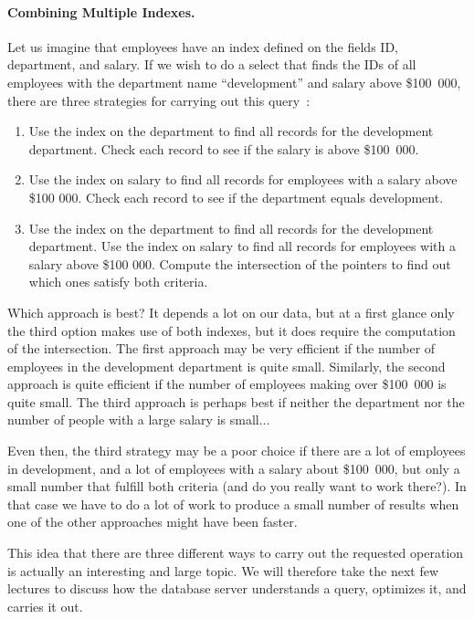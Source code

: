 \paragraph{Combining Multiple Indexes.} Let us imagine that employees have an index defined on the fields ID, department, and salary. If we wish to do a select that finds the IDs of all employees with the department name ``development'' and salary above \$100~000, there are three strategies for carrying out this query~\cite{dsc}:

\begin{enumerate}
	\item Use the index on the department to find all records for the development department. Check each record to see if the salary is above \$100~000.
	\item Use the index on salary to find all records for employees with a salary above \$100 000. Check each record to see if the department equals development.
	\item Use the index on the department to find all records for the development department. Use the index on salary to find all records for employees with a salary above \$100 000. Compute the intersection of the pointers to find out which ones satisfy both criteria.
\end{enumerate}

Which approach is best? It depends a lot on our data, but at a first glance only the third option makes use of both indexes, but it does require the computation of the intersection. The first approach may be very efficient if the number of employees in the development department is quite small. Similarly, the second approach is quite efficient if the number of employees making over \$100~000 is quite small. The third approach is perhaps best if neither the department nor the number of people with a large salary is small...

Even then, the third strategy may be a poor choice if there are a lot of employees in development, and a lot of employees with a salary about \$100~000, but only a small number that fulfill both criteria (and do you really want to work there?). In that case we have to do a lot of work to produce a small number of results when one of the other approaches might have been faster. 

This idea that there are three different ways to carry out the requested operation is actually an interesting and large topic. We will therefore take the next few lectures to discuss how the database server understands a query, optimizes it, and carries it out. 




